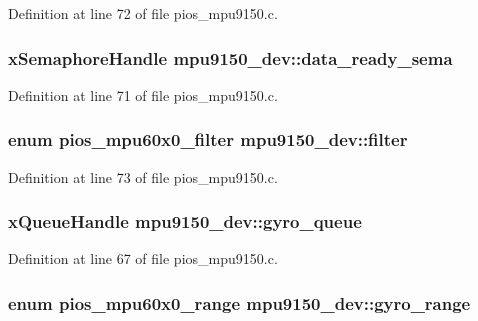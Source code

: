 \-Definition at line 72 of file pios\-\_\-mpu9150.\-c.

\hypertarget{structmpu9150__dev_a28bcee6727b79ac6759680b8f8124c53}{
\subsubsection[{data\-\_\-ready\-\_\-sema}]{\setlength{\rightskip}{0pt plus 5cm}x\-Semaphore\-Handle {\bf mpu9150\-\_\-dev\-::data\-\_\-ready\-\_\-sema}}}\label{structmpu9150__dev_a28bcee6727b79ac6759680b8f8124c53}


\-Definition at line 71 of file pios\-\_\-mpu9150.\-c.

\hypertarget{structmpu9150__dev_add26a550633bea24f7d02c827a8032e8}{
\subsubsection[{filter}]{\setlength{\rightskip}{0pt plus 5cm}enum {\bf pios\-\_\-mpu60x0\-\_\-filter} {\bf mpu9150\-\_\-dev\-::filter}}}\label{structmpu9150__dev_add26a550633bea24f7d02c827a8032e8}


\-Definition at line 73 of file pios\-\_\-mpu9150.\-c.

\hypertarget{structmpu9150__dev_a64adb1a56859fd674c9ab40800c51c67}{
\subsubsection[{gyro\-\_\-queue}]{\setlength{\rightskip}{0pt plus 5cm}x\-Queue\-Handle {\bf mpu9150\-\_\-dev\-::gyro\-\_\-queue}}}\label{structmpu9150__dev_a64adb1a56859fd674c9ab40800c51c67}


\-Definition at line 67 of file pios\-\_\-mpu9150.\-c.

\hypertarget{structmpu9150__dev_a5b09effc92ea527ca1c143edbd631f38}{
\subsubsection[{gyro\-\_\-range}]{\setlength{\rightskip}{0pt plus 5cm}enum {\bf pios\-\_\-mpu60x0\-\_\-range} {\bf mpu9150\-\_\-dev\-::gyro\-\_\-range}}}\label{structmpu9150__dev_a5b09effc92ea527ca1c143edbd631f38}


